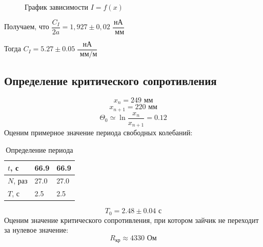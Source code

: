 \documentclass[a4paper, 12pt]{article}
\begin{document}
\begin{table}[H]
\caption{Полученные значения}
\label{my-label}
\end{table}



	\begin {figure}[H]
		\begin{center}
			
			\caption{График зависимости $I = f(x)$}
		\end{center}
	\end {figure}

Получаем, что $\dfrac{C_I}{2a} = 1,927\pm 0,02 \; \dfrac{\text{нА}}{\text{ мм}}$

Тогда $C_I = 5.27 \pm 0.05 \; \dfrac{\text{нА}}{\text{ мм$/$м}}$
	
\subsection*{Определение критического сопротивления}
$$x_n = 249 \text{ мм}$$
$$x_{n+1} = 220 \text{ мм}$$
$$\Theta_0 \simeq \ln \dfrac{x_n}{x_{n+1}} = 0.12$$	
Оценим примерное значение периода свободных колебаний:
\begin{table}[H]
\centering
\begin{tabular}{|l|l|l|}
\hline
$t$, с   & 66.9 & 66.9 \\ \hline
$N$, раз & 27.0 & 27.0 \\ \hline
$T$, с   & 2.5  & 2.5  \\ \hline
\end{tabular}
\caption{Определение периода}
\label{my-label}
\end{table}
$$T_0 = 2.48 \pm 0.04 \text{ с}$$
Оценим значение критического сопротивления, при котором зайчик не переходит за нулевое значение:
$$R_{\text{кр}} \approx 4330 \text{ Ом}$$
\end{document}
